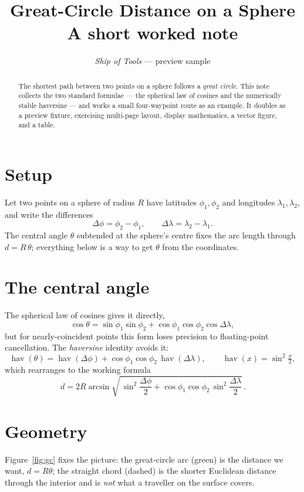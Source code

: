 \documentclass[11pt]{article}
\title{\textbf{Great-Circle Distance on a Sphere}\\[2pt]
  \normalsize A short worked note}
\author{\textsl{Ship of Tools} — preview sample}
\date{}
\newcommand{\hav}{\operatorname{hav}}
\begin{document}
\maketitle
\thispagestyle{empty}

\begin{abstract}
\noindent The shortest path between two points on a sphere follows a
\emph{great circle}. This note collects the two standard formulae — the
spherical law of cosines and the numerically stable haversine — and works a
small four-waypoint route as an example. It doubles as a preview fixture,
exercising multi-page layout, display mathematics, a vector figure, and a
table.
\end{abstract}

\section{Setup}
Let two points on a sphere of radius $R$ have latitudes $\phi_1,\phi_2$ and
longitudes $\lambda_1,\lambda_2$, and write the differences
\[
  \Delta\phi = \phi_2-\phi_1, \qquad \Delta\lambda = \lambda_2-\lambda_1 .
\]
The central angle $\theta$ subtended at the sphere's centre fixes the arc
length through $d = R\,\theta$; everything below is a way to get $\theta$ from
the coordinates.

\section{The central angle}
The spherical law of cosines gives it directly,
\[
  \cos\theta = \sin\phi_1\sin\phi_2
             + \cos\phi_1\cos\phi_2\cos\Delta\lambda ,
\]
but for nearly-coincident points this form loses precision to floating-point
cancellation. The \emph{haversine} identity avoids it:
\[
  \hav(\theta) = \hav(\Delta\phi)
    + \cos\phi_1\cos\phi_2\,\hav(\Delta\lambda),
  \qquad \hav(x) = \sin^2\!\tfrac{x}{2},
\]
which rearranges to the working formula
\[
  \boxed{\,d = 2R \arcsin\sqrt{\,\sin^2\!\frac{\Delta\phi}{2}
    + \cos\phi_1\cos\phi_2\,\sin^2\!\frac{\Delta\lambda}{2}}\,}.
\]

\newpage

\section{Geometry}
Figure~\ref{fig:gc} fixes the picture: the great-circle arc (green) is the
distance we want, $d = R\theta$; the straight chord (dashed) is the shorter
Euclidean distance through the interior and is \emph{not} what a traveller on
the surface covers.
\end{document}
